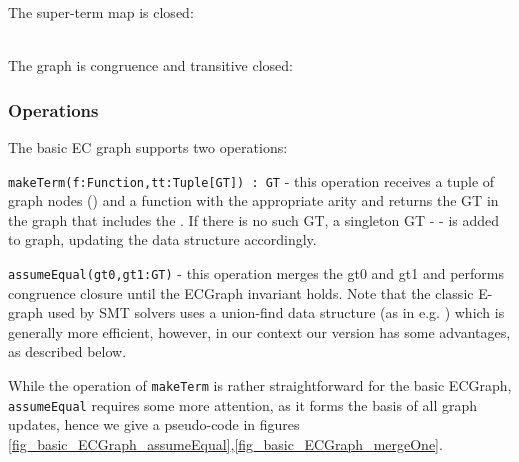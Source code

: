 \noindent
The super-term map is closed:\\
\\

\noindent
The graph is congruence and transitive closed:\\


\subsubsection*{Operations}
The basic EC graph supports two operations:

\bigskip

\noindent
\lstinline|makeTerm(f:Function,tt:Tuple[GT]) : GT| - this operation receives a tuple of graph nodes () and a function with the appropriate arity and returns the GT in the graph that includes the \GFA{} .
If there is no such GT, a singleton GT -  - is added to graph, updating the data structure accordingly.

\bigskip

\noindent
\lstinline|assumeEqual(gt0,gt1:GT)| - this operation merges the \GTs{} gt0 and gt1 and performs congruence closure until the ECGraph invariant holds. Note that the classic E-graph used by SMT solvers uses a union-find data structure (as in e.g. \cite{NelsonOppenUnionFind}) which is generally more efficient, however, in our context our version has some advantages, as described below.

\bigskip

\noindent
While the operation of \lstinline|makeTerm| is rather straightforward for the basic ECGraph, \lstinline|assumeEqual| requires some more attention, as it forms the basis of all graph updates, hence we give a pseudo-code in figures \ref{fig_basic_ECGraph_assumeEqual},\ref{fig_basic_ECGraph_mergeOne}.

